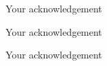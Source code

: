 \begin{acknowledgement}
Your acknowledgement

Your acknowledgement

Your acknowledgement
\end{acknowledgement}